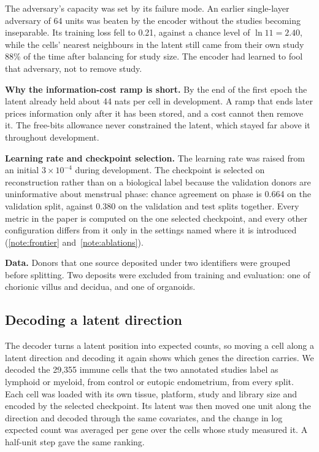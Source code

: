 The adversary's capacity was set by its failure mode. An earlier
single-layer adversary of 64 units was beaten by the encoder without the
studies becoming inseparable. Its training loss fell to 0.21, against a
chance level of $\ln 11 = 2.40$, while the cells' nearest neighbours in the
latent still came from their own study 88\% of the time after balancing
for study size. The encoder had learned to fool that adversary, not to
remove study.

\textbf{Why the information-cost ramp is short.} By the end of the first
epoch the latent already held about 44 nats per cell in development. A ramp
that ends later prices information only after it has been stored, and a
cost cannot then remove it. The free-bits allowance never constrained the
latent, which stayed far above it throughout development.

\textbf{Learning rate and checkpoint selection.} The learning rate was
raised from an initial $3 \times 10^{-4}$ during development. The
checkpoint is selected on reconstruction rather than on a biological label
because the validation donors are uninformative about menstrual phase:
chance agreement on phase is 0.664 on the validation split, against 0.380
on the validation and test splits together. Every metric in the paper is
computed on the one selected checkpoint, and every other configuration
differs from it only in the settings named where it is introduced
(\ref{note:frontier} and~\ref{note:ablations}).

\textbf{Data.} Donors that one source deposited under two identifiers were
grouped before splitting. Two deposits were excluded from training and
evaluation: one of chorionic villus and decidua, and one of organoids.

\begin{table}[t]
\centering
\caption[Hyperparameters]{\textbf{Every setting of the reported model.}
Generated from the training run's own recorded configuration and log. KL,
Kullback--Leibler divergence. The adversary's gradient is reversed and
scaled by $\lambda_{\mathrm{dab}}$ on its way to the encoder.}
\label{stab:hyperparameters}
\small

\end{table}

\subsection{Decoding a latent direction}
\label{smeth:decoding}

The decoder turns a latent position into expected counts, so moving a cell
along a latent direction and decoding it again shows which genes the
direction carries. We decoded the 29{,}355 immune cells that the two
annotated studies label as lymphoid or myeloid, from control or eutopic
endometrium, from every split. Each cell was loaded with its own tissue,
platform, study and library size and encoded by the selected checkpoint.
Its latent was then moved one unit along the direction and decoded through
the same covariates, and the change in log expected count was averaged per
gene over the cells whose study measured it. A half-unit step gave the same
ranking.

